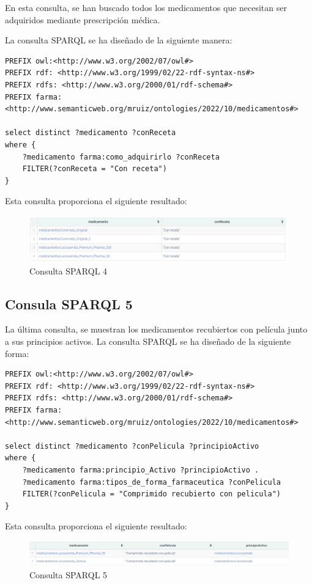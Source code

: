 \documentclass[../main.tex]{subfiles}
\begin{document}
En esta consulta, se han buscado todos los medicamentos que necesitan ser adquiridos mediante prescripción médica.

La consulta SPARQL se ha diseñado de la siguiente manera:
\begin{lstlisting}
PREFIX owl:<http://www.w3.org/2002/07/owl#>
PREFIX rdf: <http://www.w3.org/1999/02/22-rdf-syntax-ns#>
PREFIX rdfs: <http://www.w3.org/2000/01/rdf-schema#>
PREFIX farma: <http://www.semanticweb.org/mruiz/ontologies/2022/10/medicamentos#>

select distinct ?medicamento ?conReceta
where {
    ?medicamento farma:como_adquirirlo ?conReceta
	FILTER(?conReceta = "Con receta")   
}
\end{lstlisting}
Esta consulta proporciona el siguiente resultado:
\begin{figure}[h]
    \centering
    \includegraphics[scale=0.2]{images/medicamentosReceta.png}
    \caption{Consulta SPARQL 4}
    \label{fig:mesh1}
\end{figure}

\subsection{Consula SPARQL 5}
La última consulta, se muestran los medicamentos recubiertos con película junto a sus principios activos.
La consulta SPARQL se ha diseñado de la siguiente forma:
\begin{lstlisting}
PREFIX owl:<http://www.w3.org/2002/07/owl#>
PREFIX rdf: <http://www.w3.org/1999/02/22-rdf-syntax-ns#>
PREFIX rdfs: <http://www.w3.org/2000/01/rdf-schema#>
PREFIX farma: <http://www.semanticweb.org/mruiz/ontologies/2022/10/medicamentos#>

select distinct ?medicamento ?conPelicula ?principioActivo
where {
    ?medicamento farma:principio_Activo ?principioActivo .
    ?medicamento farma:tipos_de_forma_farmaceutica ?conPelicula
	FILTER(?conPelicula = "Comprimido recubierto con pelicula")   
}
\end{lstlisting}
Esta consulta proporciona el siguiente resultado:
\begin{figure}[h]
    \centering
    \includegraphics[scale=0.2]{images/conPelicula-SPARQL.png}
    \caption{Consulta SPARQL 5}
    \label{fig:mesh1}
\end{figure}
\end{document}

